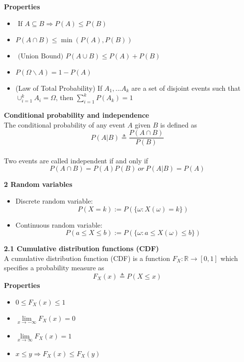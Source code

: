 \documentclass[10pt,a4paper,oneside]{beamer}
\begin{document}
\begin{frame}
\vspace{0.5cm}
{\bfseries Properties}
\vspace{0.1cm}\\
\begin{itemize}
\item $\text { If } A \subseteq B \Longrightarrow P(A) \leq P(B)$
\item $P(A \cap B) \leq \min (P(A), P(B))$
\item $\text { (Union Bound) } P(A \cup B) \leq P(A)+P(B)$
\item $ P(\Omega \backslash A)=1-P(A)$
\item (Law of Total Probability) If $A_1,...A_k$ are a set of disjoint events such that $\cup_{i=1}^{k} A_{i}=\Omega$, 
then $\sum_{i=1}^{k} P\left(A_{k}\right)=1$
\end{itemize}
{\bfseries Conditional probability and independence}
\vspace{0.3cm}
\\The conditional probability of any event $A$ given $B$ is defined as 
\[
P(A | B) \triangleq \frac{P(A \cap B)}{P(B)}
\]
\\Two events are called independent if and only if
\[
P(A \cap B)=P(A) P(B) \ or\  P(A | B) = P(A)
\] 
\end{frame}
\begin{frame}
\vspace{0.3cm}
{\bfseries 2 Random variables}
\vspace{0.3cm}
\begin{itemize}
\item Discrete random variable:
\[
P(X=k) :=P(\{\omega : X(\omega)=k\})
\]
\item Continuous random variable:
\[
P(a \leq X \leq b) :=P(\{\omega : a \leq X(\omega) \leq b\})
\]
\end{itemize}
\end{frame}
\begin{frame}
\vspace{0.3cm}
{\bfseries 2.1 Cumulative distribution functions (CDF)} 
\vspace{0.3cm}
\\A cumulative distribution function (CDF) is a function $F_{X} : \mathbb{R} \rightarrow[0,1]$ which specifies a probability measure as
\[
F_{X}(x) \triangleq P(X \leqslant x)
\]
{\bfseries Properties}
\begin{itemize}
\item $0 \leqslant F_{X}(x) \leqslant 1$
\item $\lim\limits_{x\rightarrow-\infty} F_{X}(x)=0$ 
\item $\lim\limits_{x\rightarrow\infty} F_{X}(x)=1$
\item $x \leqslant y \Longrightarrow F_{X}(x) \leqslant F_{X}(y)$
\end{itemize} 
\end{frame}
\end{document}
